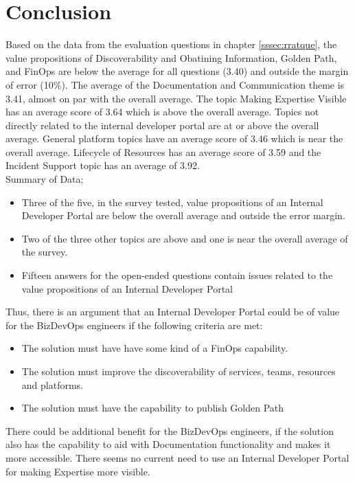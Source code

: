 \documentclass[a4paper,12pt]{article}
\begin{document}
    \section{Conclusion}
    \label{sec:conclusion}
    Based on the data from the evaluation questions in chapter \ref{sssec:rratque}, the value propositions of
    Discoverability and Obatining Information, Golden Path, and FinOps are below the average for all questions (3.40)
    and outside the margin of error (10\%).
    The average of the Documentation and Communication theme is 3.41, almost on par with the overall average.
    The topic Making Expertise Visible has an average score of 3.64 which is above the overall average.
    Topics not directly related to the internal developer portal are at or above the overall average.
    General platform topics have an average score of 3.46 which is near the overall average.
    Lifecycle of Resources has an average score of 3.59 and the Incident Support topic has an average of 3.92.\\
    Summary of Data;
    \begin{itemize}
        \item Three of the five, in the survey tested, value propositions of an Internal Developer Portal are below the overall average and outside the error margin.
        \item Two of the three other topics are above and one is near the overall average of the survey.
        \item Fifteen answers for the open-ended questions contain issues related to the value propositions of an Internal Developer Portal
    \end{itemize}
    Thus, there is an argument that an Internal Developer Portal could be of value for the BizDevOps engineers if the following
    criteria are met:
    \begin{itemize}
        \item The solution must have have some kind of a FinOps capability.
        \item The solution must improve the discoverability of services, teams, resources and platforms.
        \item The solution must have the capability to publish Golden Path
    \end{itemize}
    There could be additional benefit for the BizDevOps engineers, if the solution also has the capability to aid with
    Documentation functionality and makes it more accessible.
    There seems no current need to use an Internal Developer Portal for making Expertise more visible.
\end{document}

